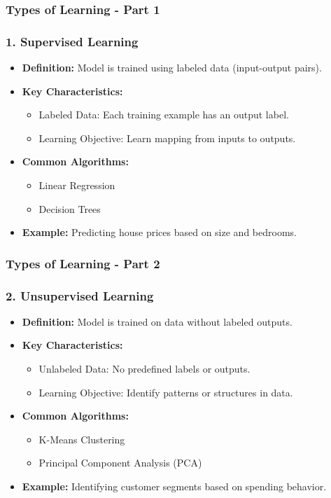 \documentclass[aspectratio=169]{beamer}
\begin{document}
\begin{frame}[fragile]
    \frametitle{Types of Learning - Part 1}
    \frametitle{1. Supervised Learning}
    
    \begin{itemize}
        \item \textbf{Definition:} Model is trained using labeled data (input-output pairs).
        \item \textbf{Key Characteristics:}
            \begin{itemize}
                \item Labeled Data: Each training example has an output label.
                \item Learning Objective: Learn mapping from inputs to outputs.
            \end{itemize}
        \item \textbf{Common Algorithms:}
            \begin{itemize}
                \item Linear Regression
                \item Decision Trees
            \end{itemize}
        \item \textbf{Example:} Predicting house prices based on size and bedrooms.
    \end{itemize}
\end{frame}

\begin{frame}[fragile]
    \frametitle{Types of Learning - Part 2}
    \frametitle{2. Unsupervised Learning}

    \begin{itemize}
        \item \textbf{Definition:} Model is trained on data without labeled outputs.
        \item \textbf{Key Characteristics:}
            \begin{itemize}
                \item Unlabeled Data: No predefined labels or outputs.
                \item Learning Objective: Identify patterns or structures in data.
            \end{itemize}
        \item \textbf{Common Algorithms:}
            \begin{itemize}
                \item K-Means Clustering
                \item Principal Component Analysis (PCA)
            \end{itemize}
        \item \textbf{Example:} Identifying customer segments based on spending behavior.
    \end{itemize}
\end{frame}
\end{document}
